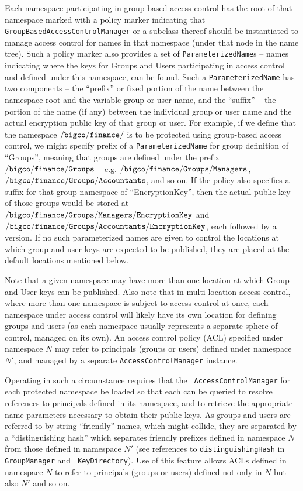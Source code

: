 Each namespace participating in group-based access control has the
root of that namespace marked with a policy marker indicating that
{\tt GroupBasedAccessControlManager} or a subclass thereof should be
instantiated to manage access control for names in that namespace
(under that node in the name tree). Such a policy marker also provides
a set of {\tt ParameterizedName}s -- names indicating where the keys
for Groups and Users participating in access control and defined under
this namespace, can be found. Such a {\tt ParameterizedName} has two
components -- the ``prefix'' or fixed portion of the name between the
namespace root and the variable group or user name, and the ``suffix''
-- the portion of the name (if any) between the individual group or
user name and the actual encryption public key of that group or
user. For example, if we define that the namespace
$\ndnxpath{/bigco/finance/}$ is to be protected using group-based
access control, we might specify prefix of a {\tt ParameterizedName}
for group definition of ``Groups'', meaning that groups are defined
under the prefix $\ndnxpath{/bigco/finance/Groups}$ --
e.g. $\ndnxpath{/bigco/finance/Groups/Managers}$,
$\ndnxpath{/bigco/finance/Groups/Accountants}$, and so on. If the
policy also specifies a suffix for that group namespace of
``EncryptionKey'', then the actual public key of those groups would be
stored at $\ndnxpath{/bigco/finance/Groups/Managers/EncryptionKey}$
and $\ndnxpath{/bigco/finance/Groups/Accountants/EncryptionKey}$, each
followed by a version. If no such parameterized names are given to control
the locations at which group and user keys are expected to be published,
they are placed at the default locations mentioned below.

Note that a given namespace may have more than one location at which
Group and User keys can be published. Also note that in multi-location
access control, where more than one namespace is subject to access
control at once, each namespace under access control will likely have
its own location for defining groups and users (as each namespace
usually represents a separate sphere of control, managed on its own).
An access control policy (ACL) specified under namespace $N$ may refer
to principals (groups or users) defined under namespace $N'$, and
managed by a separate {\tt AccessControlManager} instance. 

Operating in such a circumstance requires that the {\tt
  AccessControlManager} for each protected namespace be loaded so that
each can be queried to resolve references to principals defined in its
namespace, and to retrieve the appropriate name parameters necessary
to obtain their public keys.  As groups and users are referred to by
string ``friendly'' names, which might collide, they are separated by
a ``distinguishing hash'' which separates friendly prefixes defined in
namespace $N$ from those defined in namespace $N'$ (see references to
{\tt distinguishingHash} in {\tt GroupManager} and {\tt
  KeyDirectory}). Use of this feature allows ACLs defined in namespace
$N$ to refer to principals (groups or users) defined not only in $N$ but also
$N'$ and so on.

